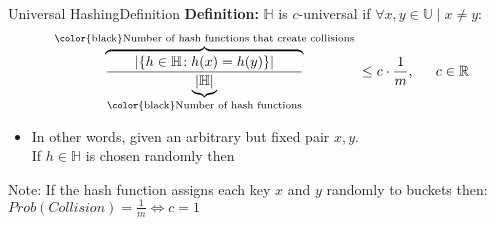 
\begin{frame}{Universal Hashing}{Definition}
  \textbf{Definition:}
  {\color{MainA}$\mathbb{H}$} is {\color{MainA}$c$-universal} if
  {\color{MainA}$\forall x, y \in \mathbb{U} \mid x \neq y:$
  \begin{displaymath}
    \overbrace{
      \frac{
        \vert \{h \in \mathbb{H}\!: h(x) = h(y)\} \vert
      }{
      \underbrace{\vert \mathbb{H} \vert}_\text{{\color{black}Number of hash functions}}
      }
    }^\text{
      {\color{black}Number of hash functions that create collisions}
    }
    \leq c \cdot \frac{1}{m}, \hspace*{1.5em} c \in \mathbb{R}
  \end{displaymath}}
  \vspace{-1em}
  \begin{itemize}
  \item<2->
      In other words, given an arbitrary but fixed pair
      {\color{MainA}$x, y$}.\\
      If {\color{MainA}$h \in \mathbb{H}$} is chosen randomly then\\
  \end{itemize}
  \begin{block}{Note: If the hash function assigns each key $x$ and $y$
      randomly to buckets then:}
    {$Prob( Collision ) = \frac{1}{m} \Leftrightarrow c = 1$}
  \end{block}
\end{frame}


